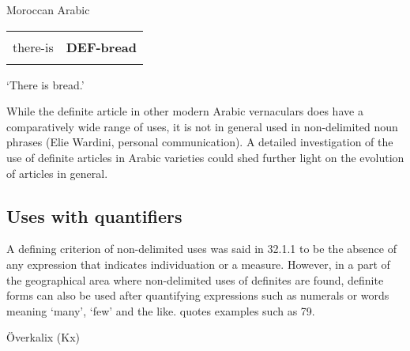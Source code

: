\begin{listWWNumileveli}
\item 

\begin{styleExample}
Moroccan Arabic

\end{styleExample}

\end{listWWNumileveli}

\begin{tabular}{ll}
\lsptoprule
\multicolumn{2}{l}{K\=ain

}\\
there-is & {\bfseries DEF-bread}\\
\lspbottomrule
\end{tabular}

\begin{styleTranslation}
‘There is bread.’

\end{styleTranslation}

\begin{styleBodyTextFirst}
While the definite article in other modern Arabic vernaculars does have a comparatively wide range of uses, it is not in general used in non-delimited noun phrases (Elie Wardini, personal communication). A detailed investigation of the use of definite articles in Arabic varieties could shed further light on the evolution of articles in general.

\end{styleBodyTextFirst}

\subsection{\rmfamily Uses with quantifiers}
\label{bkm:Ref114303795}
\begin{styleBodyTextFirst}
A defining criterion of non-delimited uses was said in 32.1.1 to be the absence of any expression that indicates individuation or a measure. However, in a part of the geographical area where non-delimited uses of definites are found, definite forms can also be used after quantifying expressions such as numerals or words meaning ‘many’, ‘few’ and the like. \citet{Delsing2003a} quotes examples such as 79.

\end{styleBodyTextFirst}

\begin{listWWNumileveli}
\item 

\begin{styleExample}
\label{bkm:Ref159664857}\label{bkm:Ref64458018}Överkalix (Kx) 

\end{styleExample}

\end{listWWNumileveli}


